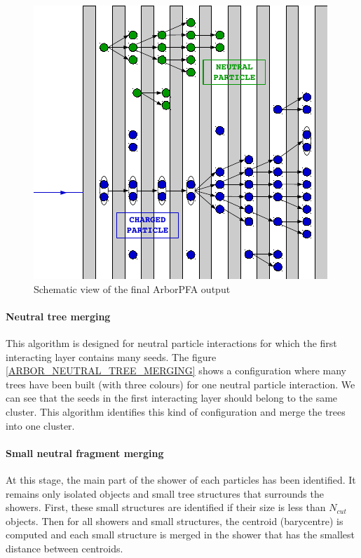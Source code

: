 \documentclass[cits]{JINST}
\begin{document}
\begin{figure}
  \vspace{-30pt}
  \begin{center}
    \includegraphics[width=\linewidth]{PfoCreation.pdf}
  \end{center}
  \vspace{-10pt}
  \caption{\label{ARBOR_PFO_CREATION} Schematic view of the final ArborPFA output}
  \vspace{-20pt}
\end{figure}

\paragraph*{Neutral tree merging} This algorithm is designed for neutral particle interactions for which the first interacting layer contains many seeds. The figure \ref{ARBOR_NEUTRAL_TREE_MERGING} shows a configuration where many trees have been built (with three colours) for one neutral particle interaction. We can see that the seeds in the first interacting layer should belong to the same cluster. This algorithm identifies this kind of configuration and merge the trees into one cluster.

\paragraph*{Small neutral fragment merging} At this stage, the main part of the shower of each particles has been identified. It remains only isolated objects and small tree structures that surrounds the showers. First, these small structures are identified if their size is less than $N_{cut}$ objects. Then for all showers and small structures, the centroid (barycentre) is computed and each small structure is merged in the shower that has the smallest distance between centroids.
\end{document}
